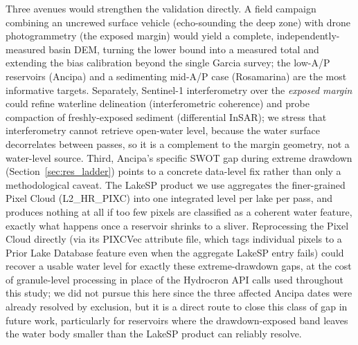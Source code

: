 Three avenues would strengthen the validation directly. A field campaign combining an
uncrewed surface vehicle (echo-sounding the deep zone) with drone photogrammetry (the
exposed margin) would yield a complete, independently-measured basin DEM, turning the
lower bound into a measured total and extending the bias calibration beyond the single
Garcia survey; the low-A/P reservoirs (Ancipa) and a sedimenting mid-A/P case
(Rosamarina) are the most informative targets. Separately, Sentinel-1 interferometry
over the \emph{exposed margin} could refine waterline delineation (interferometric
coherence) and probe compaction of freshly-exposed sediment (differential InSAR); we
stress that interferometry cannot retrieve open-water level, because the water surface
decorrelates between passes, so it is a complement to the margin geometry, not a
water-level source. Third, Ancipa's specific SWOT gap during extreme drawdown
(Section~\ref{sec:res_ladder}) points to a concrete data-level fix rather than only a
methodological caveat. The LakeSP product we use aggregates the finer-grained Pixel
Cloud (L2\_HR\_PIXC) into one integrated level per lake per pass, and produces nothing
at all if too few pixels are classified as a coherent water feature, exactly what
happens once a reservoir shrinks to a sliver. Reprocessing the Pixel Cloud directly
(via its PIXCVec attribute file, which tags individual pixels to a Prior Lake Database
feature even when the aggregate LakeSP entry fails) could recover a usable water level
for exactly these extreme-drawdown gaps, at the cost of granule-level processing in
place of the Hydrocron API calls used throughout this study; we did not pursue this
here since the three affected Ancipa dates were already resolved by exclusion, but it
is a direct route to close this class of gap in future work, particularly for
reservoirs where the drawdown-exposed band leaves the water body smaller than the
LakeSP product can reliably resolve.
